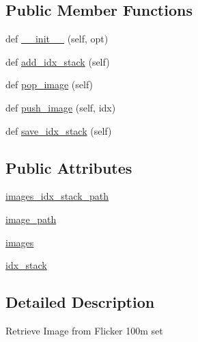 \subsection*{Public Member Functions}
\begin{DoxyCompactItemize}
\item 
def \hyperlink{classpersonality__captions_1_1worlds_1_1ImageGenerator_adeb74aa2ebf4ace2c39ab7f811629b98}{\+\_\+\+\_\+init\+\_\+\+\_\+} (self, opt)
\item 
def \hyperlink{classpersonality__captions_1_1worlds_1_1ImageGenerator_a4861d21c69ec7e05b958d948b55dbbec}{add\+\_\+idx\+\_\+stack} (self)
\item 
def \hyperlink{classpersonality__captions_1_1worlds_1_1ImageGenerator_a3ed9513ae59885f39f95a65d610b9b54}{pop\+\_\+image} (self)
\item 
def \hyperlink{classpersonality__captions_1_1worlds_1_1ImageGenerator_a78705bbcfdb530dc94ff25cc0aa7fd65}{push\+\_\+image} (self, idx)
\item 
def \hyperlink{classpersonality__captions_1_1worlds_1_1ImageGenerator_a1a62516fa0aad79a400d8824f7353d42}{save\+\_\+idx\+\_\+stack} (self)
\end{DoxyCompactItemize}
\subsection*{Public Attributes}
\begin{DoxyCompactItemize}
\item 
\hyperlink{classpersonality__captions_1_1worlds_1_1ImageGenerator_a3cb7292fe4be4bd3e9c1e16e763da509}{images\+\_\+idx\+\_\+stack\+\_\+path}
\item 
\hyperlink{classpersonality__captions_1_1worlds_1_1ImageGenerator_a2f6d917895f5fa19821b69f793dc1dd7}{image\+\_\+path}
\item 
\hyperlink{classpersonality__captions_1_1worlds_1_1ImageGenerator_a28a704ac1a923cc558c63ac4bcf2bb65}{images}
\item 
\hyperlink{classpersonality__captions_1_1worlds_1_1ImageGenerator_a4a79f6542b070b63fb41d09306a95ef9}{idx\+\_\+stack}
\end{DoxyCompactItemize}


\subsection{Detailed Description}
\begin{DoxyVerb}Retrieve Image from Flicker 100m set\end{DoxyVerb}
 

